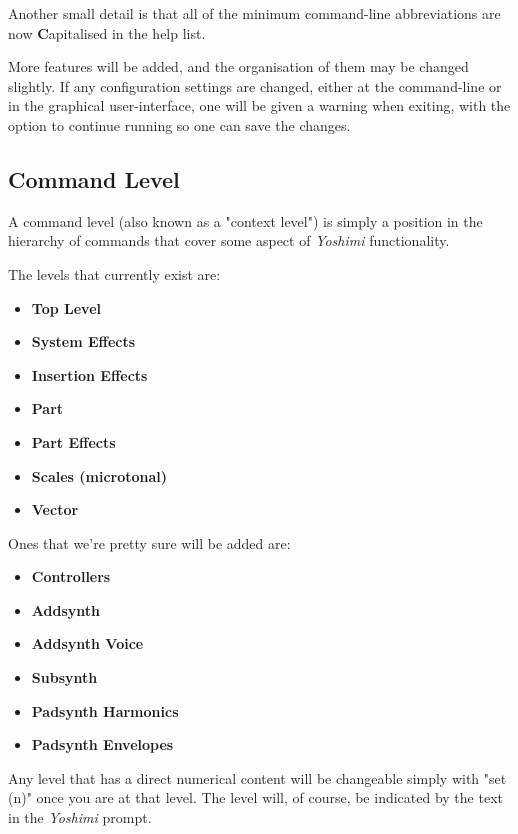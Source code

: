    Another small detail is that all of the minimum command-line
   abbreviations are now \textbf{C}apitalised in the help list.

   More features will be added, and the organisation of them may be changed
   slightly.  If any configuration settings are changed, either at the
   command-line or in the graphical user-interface, one will be given a warning
   when exiting, with the option to continue running so one can save the
   changes.

\subsection{Command Level}
\label{subsec:command_line_command_level}

   A command level
   (also known as a "context level")
   is simply a position in the hierarchy of commands that cover
   some aspect of \textsl{Yoshimi} functionality.

   The levels that currently exist are:

   \begin{itemize}
      \item \textbf{Top Level}
      \item \textbf{System Effects}
      \item \textbf{Insertion Effects}
      \item \textbf{Part}
      \item \textbf{Part Effects}
      \item \textbf{Scales (microtonal)}
      \item \textbf{Vector}
   \end{itemize}

Ones that we're pretty sure will be added are:

   \begin{itemize}
      \item \textbf{Controllers}
      \item \textbf{Addsynth}
      \item \textbf{Addsynth Voice}
      \item \textbf{Subsynth}
      \item \textbf{Padsynth Harmonics}
      \item \textbf{Padsynth Envelopes}
   \end{itemize}

   Any level that has a direct numerical content will be changeable simply with
   "set (n)" once you are at that level.  The level will, of course, be
   indicated by the text in the \textsl{Yoshimi} prompt.

